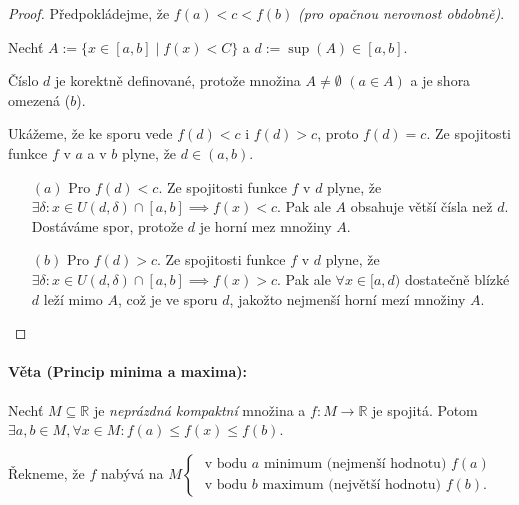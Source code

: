 \documentclass[10pt,a4paper]{article}
\newcommand{\R}{{\mathbb{R}}}
\begin{document}
\begin{proof}
    Předpokládejme, že $f(a) < c < f(b)$ \textit{(pro opačnou nerovnost obdobně)}. 
    
    Nechť $A := \{x\in [a,b] \mid f(x) < C\}$ a $d:=\sup(A) \in [a,b]$. 
    
    Číslo $d$ je korektně definované, protože množina $A \neq \emptyset$ $(a \in A)$ a je shora omezená ($b$).
    
    Ukážeme, že ke sporu vede $f(d) < c$ i $f(d) > c$, proto $f(d) = c$.
    Ze spojitosti funkce $f$ v $a$ a v $b$ plyne, že $d \in (a, b)$.
    
    \begin{itemize}
        \item [$(a)$] Pro $f(d) < c$. Ze spojitosti funkce $f$ v $d$ plyne, že $\exists \delta : x \in U(d, \delta) \cap [a, b] \implies f(x) < c$.
        Pak ale $A$ obsahuje větší čísla než $d$. Dostáváme spor, protože $d$ je horní mez množiny $A$.
        \item [$(b)$] Pro $f(d) > c$. Ze spojitosti funkce $f$ v $d$ plyne, že $\exists \delta : x \in U(d, \delta) \cap [a, b] \implies f(x) > c$.
            Pak ale $\forall x \in [a, d)$ dostatečně blízké $d$ leží mimo $A$, což je ve sporu $d$, jakožto nejmenší horní mezí množiny $A$.
    \end{itemize}
\end{proof}


\paragraph*{Věta (Princip minima a maxima):} Nechť $M \subseteq \R$ je \textit{neprázdná kompaktní} množina a $f : M \to \R$ je spojitá.
Potom $\exists a, b \in M, \forall x \in M: f(a) \leq f(x) \leq f(b)$. 

Řekneme, že $f$ nabývá na $M \begin{cases} 
    \text{ v bodu $a$ minimum (nejmenší hodnotu) $f(a)$ }\\
    \text{ v bodu $b$ maximum (největší hodnotu) $f(b)$.}
\end{cases}$
\end{document}
